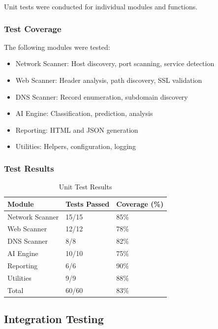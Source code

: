\documentclass[12pt,a4paper]{report}
\begin{document}
Unit tests were conducted for individual modules and functions.

\subsubsection{Test Coverage}

The following modules were tested:

\begin{itemize}
    \item Network Scanner: Host discovery, port scanning, service detection
    \item Web Scanner: Header analysis, path discovery, SSL validation
    \item DNS Scanner: Record enumeration, subdomain discovery
    \item AI Engine: Classification, prediction, analysis
    \item Reporting: HTML and JSON generation
    \item Utilities: Helpers, configuration, logging
\end{itemize}

\subsubsection{Test Results}

\begin{table}[H]
    \centering
    \caption{Unit Test Results}
    \label{tab:unit_tests}
    \begin{tabular}{@{}lll@{}}
        \toprule
        Module & Tests Passed & Coverage (\%) \\
        \midrule
        Network Scanner & 15/15 & 85\% \\
        Web Scanner & 12/12 & 78\% \\
        DNS Scanner & 8/8 & 82\% \\
        AI Engine & 10/10 & 75\% \\
        Reporting & 6/6 & 90\% \\
        Utilities & 9/9 & 88\% \\
        \midrule
        Total & 60/60 & 83\% \\
        \bottomrule
    \end{tabular}
\end{table}

\subsection{Integration Testing}
\end{document}
